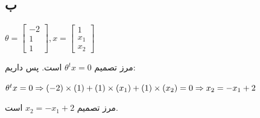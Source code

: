 \documentclass{article}
\begin{document}
\subsection{ب}
\begin{latin}
$
\theta =
\begin{bmatrix}
-2 \\
1 \\
1
\end{bmatrix},
x = 
\begin{bmatrix}
1 \\
x_1 \\
x_2
\end{bmatrix}
$
\end{latin}
مرز تصمیم $\theta ^ t x = 0$ است. پس داریم:
\begin{latin}
$
\theta ^ t x = 0 \\ \Rightarrow 
\left( -2 \right) \times \left( 1 \right) + \left( 1 \right) \times \left( x_1 \right) + \left( 1 \right) \times \left( x_2 \right) = 0 \\ \Rightarrow 
x_2 = -x_1 + 2
$
\end{latin}
مرز تصمیم $x_2 = -x_1 + 2$ است.
\end{document}
